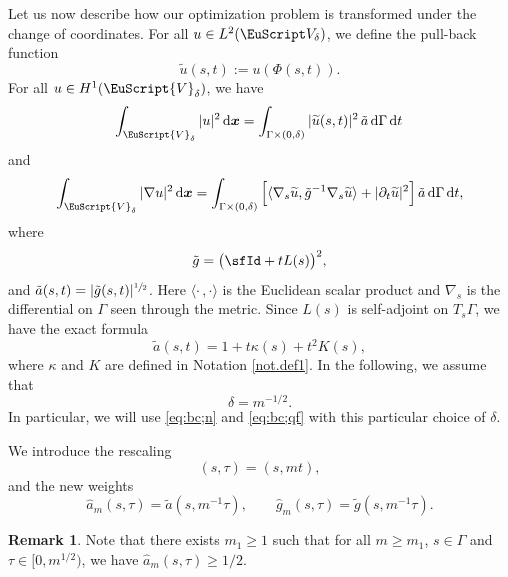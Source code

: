 \documentclass[JEP,XML,SOM,Unicode]{cedram}
\let\mathcal \EuScript
\newcommand{\cV}{\mathcal{V}}
\theoremstyle{plain}
\theoremstyle{definition}
\newtheorem{remark}[theorem]{Remark}
\newcommand{\dx}{\mathrm{\,d}}
\newcommand{\bx}{{\boldsymbol x}}
\begin{document}
Let us now describe how our optimization problem is transformed under the change of coordinates. For all $u\in L^{2}(\mathcal V_{\delta})$, we define the pull-back function
\begin{equation}\label{eq:trans-st}
\widetilde u(s,t):= u(\Phi(s,t)).
\end{equation}
For all $u\in H^{1}(\cV_{\delta})$, we have
\begin{equation}\label{eq:bc;n}
\int_{\cV_{\delta}}|u|^{2}\dx\bx=\int_{\Gamma\times(0,\delta)}|\widetilde u(s,t)|^{2}\,\tilde a\dx \Gamma \dx t\,
\end{equation}
and
\begin{equation}\label{eq:bc;qf}
\int_{\cV_{\delta}}|\nabla u|^{2}\dx\bx= \int_{\Gamma\times(0,\delta)} \Big[\langle\nabla_{s} \widetilde u,\tilde g^{-1}\nabla_{s} \widetilde u\rangle +|\partial_{t}\widetilde u|^{2}\Big]\,\tilde a\dx \Gamma\dx t,
\end{equation}
where
\[\tilde g=\big(\sfId+tL(s)\big)^2,\]
and $\tilde a(s,t)= |\tilde g(s,t)|^{\sfrac{1}{2}}$. Here $\langle\cdot\,,\cdot\rangle$ is the Euclidean scalar product and $\nabla_{s}$ is the differential on $\Gamma$ seen through the metric.
Since
$L(s)$ is self-adjoint on $T_s\Gamma$,
we have the exact formula
\begin{equation}\label{eq.Taylor3}
\tilde{a}(s,t) = 1+t\kappa(s) + t^2K(s),
\end{equation}
where $\kappa$ and $K$ are defined in Notation \ref{not.def1}. In the following, we assume that
\begin{equation}\label{eq:depdeltam}
\delta = m^{-1/2}.
\end{equation}
In particular, we will use \eqref{eq:bc;n} and \eqref{eq:bc;qf} with this particular choice of $\delta$.

\label{sec.rescaled}

We introduce the rescaling
\[(s,\tau)=(s,mt),\]
and the new weights
\begin{equation}\label{eq:Jac-a'}
\widehat a_m(s,\tau)=\tilde a(s,m^{-1}\tau),\qquad \widehat g_m(s,\tau)=\tilde g(s,m^{-1}\tau).
\end{equation}

\begin{remark}\label{rem.m1}
Note that there exists $m_1\geq1$ such that for all $m\geq m_1$, $s\in \Gamma$ and $\tau\in[0,m^{1/2})$, we have $\widehat a_m(s,\tau)\geq 1/2$.
\end{remark}
\end{document}
